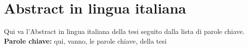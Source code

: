 \chapter*{Abstract in lingua italiana}
Qui va l'Abstract in lingua italiana della tesi seguito dalla lista di parole chiave.
\\
\textbf{Parole chiave:} qui, vanno, le parole chiave, della tesi %